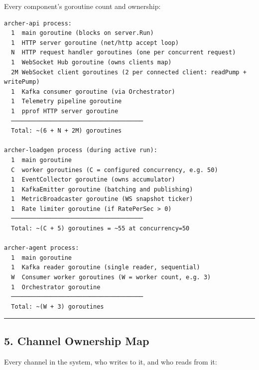 \documentclass[
]{article}
\begin{document}
Every component's goroutine count and ownership:

\begin{verbatim}
archer-api process:
  1  main goroutine (blocks on server.Run)
  1  HTTP server goroutine (net/http accept loop)
  N  HTTP request handler goroutines (one per concurrent request)
  1  WebSocket Hub goroutine (owns clients map)
  2M WebSocket client goroutines (2 per connected client: readPump + writePump)
  1  Kafka consumer goroutine (via Orchestrator)
  1  Telemetry pipeline goroutine
  1  pprof HTTP server goroutine
  ─────────────────────────────────────
  Total: ~(6 + N + 2M) goroutines

archer-loadgen process (during active run):
  1  main goroutine
  C  worker goroutines (C = configured concurrency, e.g. 50)
  1  EventCollector goroutine (owns accumulator)
  1  KafkaEmitter goroutine (batching and publishing)
  1  MetricBroadcaster goroutine (WS snapshot ticker)
  1  Rate limiter goroutine (if RatePerSec > 0)
  ─────────────────────────────────────
  Total: ~(C + 5) goroutines = ~55 at concurrency=50

archer-agent process:
  1  main goroutine
  1  Kafka reader goroutine (single reader, sequential)
  W  Consumer worker goroutines (W = worker count, e.g. 3)
  1  Orchestrator goroutine
  ─────────────────────────────────────
  Total: ~(W + 3) goroutines
\end{verbatim}

\begin{center}\rule{0.5\linewidth}{0.5pt}\end{center}

\hypertarget{channel-ownership-map}{%
\subsection{5. Channel Ownership Map}\label{channel-ownership-map}}

Every channel in the system, who writes to it, and who reads from it:
\end{document}
